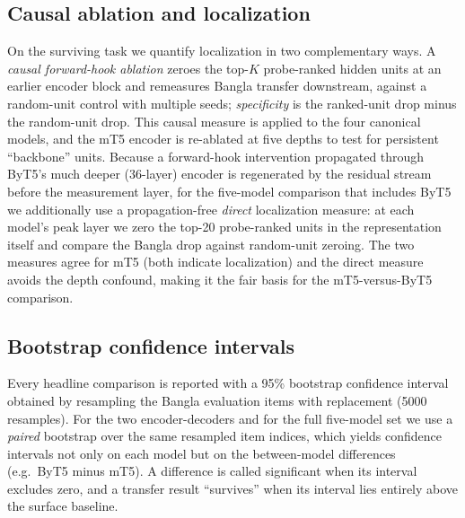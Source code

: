 \documentclass[preprint,12pt]{elsarticle}
\begin{document}
\subsection{Causal ablation and localization}
On the surviving task we quantify localization in two complementary ways. A \emph{causal forward-hook ablation} zeroes the top-$K$ probe-ranked hidden units at an earlier encoder block and remeasures Bangla transfer downstream, against a random-unit control with multiple seeds; \emph{specificity} is the ranked-unit drop minus the random-unit drop. This causal measure is applied to the four canonical models, and the mT5 encoder is re-ablated at five depths to test for persistent ``backbone'' units. Because a forward-hook intervention propagated through ByT5's much deeper (36-layer) encoder is regenerated by the residual stream before the measurement layer, for the five-model comparison that includes ByT5 we additionally use a propagation-free \emph{direct} localization measure: at each model's peak layer we zero the top-20 probe-ranked units in the representation itself and compare the Bangla drop against random-unit zeroing. The two measures agree for mT5 (both indicate localization) and the direct measure avoids the depth confound, making it the fair basis for the mT5-versus-ByT5 comparison.

\subsection{Bootstrap confidence intervals}
Every headline comparison is reported with a 95\% bootstrap confidence interval \cite{efron1994bootstrap} obtained by resampling the Bangla evaluation items with replacement (5000 resamples). For the two encoder-decoders and for the full five-model set we use a \emph{paired} bootstrap over the same resampled item indices, which yields confidence intervals not only on each model but on the between-model differences (e.g.\ ByT5 minus mT5). A difference is called significant when its interval excludes zero, and a transfer result ``survives'' when its interval lies entirely above the surface baseline.
\end{document}
